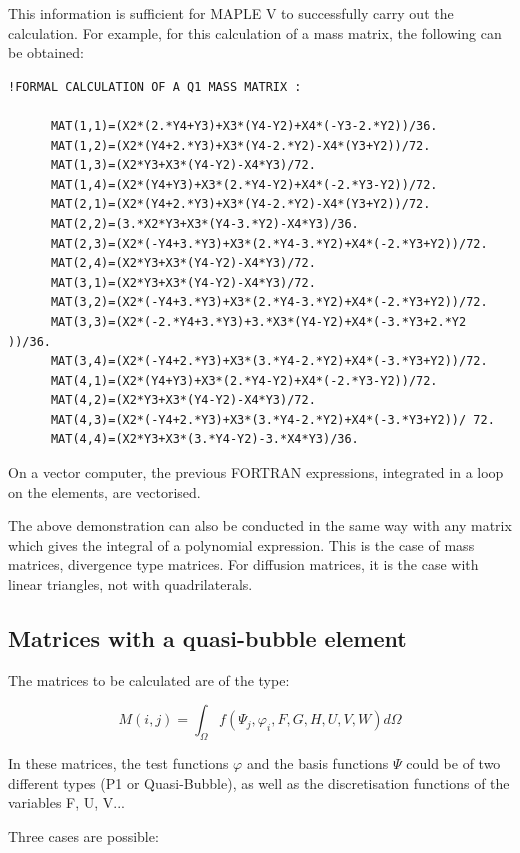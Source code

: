 This information is sufficient for MAPLE V to successfully carry out the
calculation. For example, for this calculation of a mass matrix, the following
can be obtained:
\begin{lstlisting}[language=TelFortran]
!FORMAL CALCULATION OF A Q1 MASS MATRIX :

      MAT(1,1)=(X2*(2.*Y4+Y3)+X3*(Y4-Y2)+X4*(-Y3-2.*Y2))/36.
      MAT(1,2)=(X2*(Y4+2.*Y3)+X3*(Y4-2.*Y2)-X4*(Y3+Y2))/72.
      MAT(1,3)=(X2*Y3+X3*(Y4-Y2)-X4*Y3)/72.
      MAT(1,4)=(X2*(Y4+Y3)+X3*(2.*Y4-Y2)+X4*(-2.*Y3-Y2))/72.
      MAT(2,1)=(X2*(Y4+2.*Y3)+X3*(Y4-2.*Y2)-X4*(Y3+Y2))/72.
      MAT(2,2)=(3.*X2*Y3+X3*(Y4-3.*Y2)-X4*Y3)/36.
      MAT(2,3)=(X2*(-Y4+3.*Y3)+X3*(2.*Y4-3.*Y2)+X4*(-2.*Y3+Y2))/72.
      MAT(2,4)=(X2*Y3+X3*(Y4-Y2)-X4*Y3)/72.
      MAT(3,1)=(X2*Y3+X3*(Y4-Y2)-X4*Y3)/72.
      MAT(3,2)=(X2*(-Y4+3.*Y3)+X3*(2.*Y4-3.*Y2)+X4*(-2.*Y3+Y2))/72.
      MAT(3,3)=(X2*(-2.*Y4+3.*Y3)+3.*X3*(Y4-Y2)+X4*(-3.*Y3+2.*Y2 ))/36.
      MAT(3,4)=(X2*(-Y4+2.*Y3)+X3*(3.*Y4-2.*Y2)+X4*(-3.*Y3+Y2))/72.
      MAT(4,1)=(X2*(Y4+Y3)+X3*(2.*Y4-Y2)+X4*(-2.*Y3-Y2))/72.
      MAT(4,2)=(X2*Y3+X3*(Y4-Y2)-X4*Y3)/72.
      MAT(4,3)=(X2*(-Y4+2.*Y3)+X3*(3.*Y4-2.*Y2)+X4*(-3.*Y3+Y2))/ 72.
      MAT(4,4)=(X2*Y3+X3*(3.*Y4-Y2)-3.*X4*Y3)/36.
\end{lstlisting}
On a vector computer, the previous FORTRAN expressions, integrated in a loop on
the elements, are vectorised.

The above demonstration can also be conducted in the same way with any matrix
which gives the integral of a polynomial expression. This is the case of mass
matrices, divergence type matrices. For diffusion matrices, it is the case with
linear triangles, not with quadrilaterals.

\subsection{Matrices with a quasi-bubble element}

The matrices to be calculated are of the type:


\[M(i,j)=\int _{\Omega }f(\Psi _{j} ,\varphi _{i} ,F,G,H,U,V,W)d\Omega  \]

In these matrices, the test functions $\varphi$ and the basis functions $\Psi$
could be of two different types (P1 or Quasi-Bubble), as well as the
discretisation functions of the variables F, U, V...

Three cases are possible:


